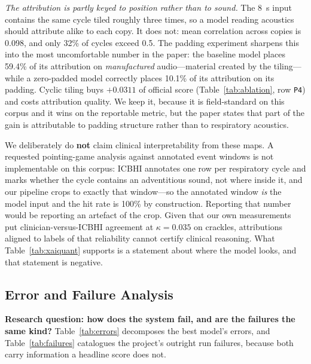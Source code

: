 \documentclass[journal,onecolumn]{IEEEtran}
\begin{document}
\emph{The attribution is partly keyed to position rather than to sound.} The 8~s
input contains the same cycle tiled roughly three times, so a model reading
acoustics should attribute alike to each copy. It does not: mean correlation across
copies is 0.098, and only 32\% of cycles exceed 0.5. The padding experiment
sharpens this into the most uncomfortable number in the paper: the baseline model
places 59.4\% of its attribution on \emph{manufactured} audio---material created
by the tiling---while a zero-padded model correctly places 10.1\% of its
attribution on its padding. Cyclic tiling buys $+0.0311$ of official score
(Table~\ref{tab:ablation}, row \texttt{P4}) and costs attribution quality. We keep
it, because it is field-standard on this corpus and it wins on the reportable
metric, but the paper states that part of the gain is attributable to padding
structure rather than to respiratory acoustics.

We deliberately do \textbf{not} claim clinical interpretability from these maps. A
requested pointing-game analysis against annotated event windows is not
implementable on this corpus: ICBHI annotates one row per respiratory cycle and
marks whether the cycle contains an adventitious sound, not where inside it, and
our pipeline crops to exactly that window---so the annotated window \emph{is} the
model input and the hit rate is 100\% by construction. Reporting that number would
be reporting an artefact of the crop. Given that our own measurements put
clinician-versus-ICBHI agreement at $\kappa = 0.035$ on crackles, attributions
aligned to labels of that reliability cannot certify clinical reasoning. What
Table~\ref{tab:xaiquant} supports is a statement about where the model looks, and
that statement is negative.

\subsection{Error and Failure Analysis}
\label{subsec:errors}

\textbf{Research question: how does the system fail, and are the failures the same
kind?} Table~\ref{tab:errors} decomposes the best model's errors, and
Table~\ref{tab:failures} catalogues the project's outright run failures, because
both carry information a headline score does not.
\end{document}
